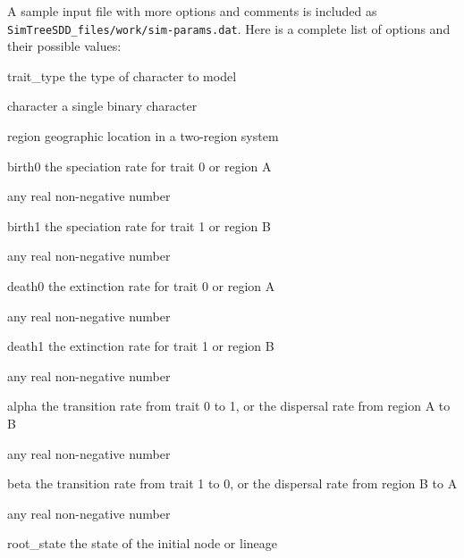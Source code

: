 \documentclass[10pt]{article}
\begin{document}
A sample input file with more options and comments is included as \texttt{SimTreeSDD\_files/work/sim-params.dat}.  
Here is a complete list of options and their possible values:
\begin{optdescrip}
	\item[trait\_type] the type of character to model
		\begin{valdescrip}
			\item[character] a single binary character
			\item[region] geographic location in a two-region system
		\end{valdescrip}
	\item[birth0] the speciation rate for trait 0 or region A
		\begin{valdescrip}
			\item[] any real non-negative number
		\end{valdescrip}
	\item[birth1] the speciation rate for trait 1 or region B
		\begin{valdescrip}
			\item[] any real non-negative number
		\end{valdescrip}
	\item[death0] the extinction rate for trait 0 or region A
		\begin{valdescrip}
			\item[] any real non-negative number
		\end{valdescrip}
	\item[death1] the extinction rate for trait 1 or region B
		\begin{valdescrip}
			\item[] any real non-negative number
		\end{valdescrip}
	\item[alpha] the transition rate from trait 0 to 1, or the dispersal rate from region A to B
		\begin{valdescrip}
			\item[] any real non-negative number
		\end{valdescrip}
	\item[beta] the transition rate from trait 1 to 0, or the dispersal rate from region B to A
		\begin{valdescrip}
			\item[] any real non-negative number
		\end{valdescrip}
	\item[root\_state] the state of the initial node or lineage
		\begin{valdescrip}

\end{valdescrip}
\end{optdescrip}
\end{document}
